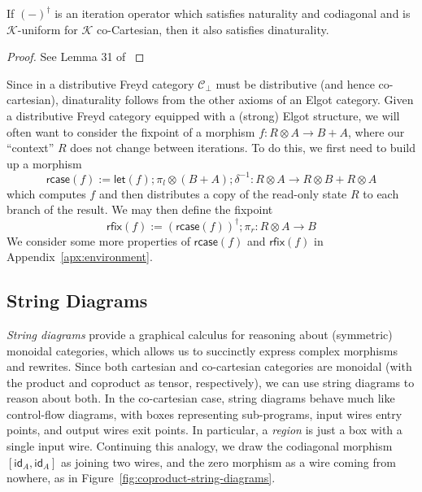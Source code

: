 \documentclass[acmsmall,screen,review]{acmart}
\newcommand{\mc}[1]{\ensuremath{\mathcal{#1}}}
\newcommand{\ms}[1]{\ensuremath{\mathsf{#1}}}
\newcommand{\lmor}[1]{\ms{let}(#1)}
\newcommand{\rcase}[1]{\ms{rcase}(#1)}
\newcommand{\rfix}[1]{\ms{rfix}(#1)}
\begin{document}
\begin{proposition}
  If $(-)^\dagger$ is an iteration operator which satisfies naturality and codiagonal and is
  $\mc{K}$-uniform for $\mc{K}$ co-Cartesian, then it also satisfies dinaturality.
\end{proposition}
\begin{proof}
  See Lemma 31 of \citet{goncharov-18-guarded-traced}
\end{proof}
Since in a distributive Freyd category $\mc{C}_\bot$ must be distributive (and hence co-cartesian),
dinaturality follows from the other axioms of an Elgot category.
%
Given a distributive Freyd category equipped with a (strong) Elgot structure, we will often want to
consider the fixpoint of a morphism $f: R \otimes A \to B + A$, where our ``context'' $R$ does not
change between iterations. To do this, we first need to build up a morphism
\begin{equation}
  \rcase{f} := \lmor{f} ; \pi_l \otimes (B + A) ; \delta^{-1} 
    : R \otimes A \to R \otimes B + R \otimes A
\end{equation}
which computes $f$ and then distributes a copy of the read-only state $R$ to each branch of the
result. We may then define the fixpoint
\begin{equation}
  \rfix{f} := (\rcase{f})^\dagger ; \pi_r : R \otimes A \to B
\end{equation}
We consider some more properties of $\rcase{f}$ and $\rfix{f}$ in Appendix~\ref{apx:environment}.

\subsection{String Diagrams}

\emph{String diagrams} provide a graphical calculus for reasoning about (symmetric) monoidal
categories, which allows us to succinctly express complex morphisms and rewrites. Since both
cartesian and co-cartesian categories are monoidal (with the product and coproduct as tensor,
respectively), we can use string diagrams to reason about both. In the co-cartesian case, string
diagrams behave much like control-flow diagrams, with boxes representing sub-programs, input wires
entry points, and output wires exit points. In particular, a \emph{region} is just a box with a
single input wire. Continuing this analogy, we draw the codiagonal morphism $[\ms{id}_A, \ms{id}_A]$
as joining two wires, and the zero morphism as a wire coming from nowhere, as in
Figure~\ref{fig:coproduct-string-diagrams}. 
\end{document}
